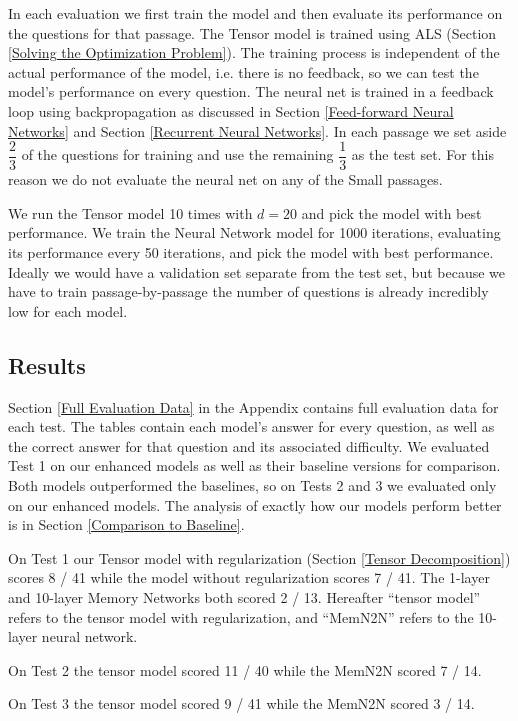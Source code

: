 \documentclass[pageno]{final_paper}
\begin{document}
In each evaluation we first train the model and then evaluate its performance on
the questions for that passage. The Tensor model is trained using ALS (Section
\ref{Solving the Optimization Problem}). The training process is independent of
the actual performance of the model, i.e. there is no feedback, so we can test
the model's performance on every question. The neural net is trained in a
feedback loop using backpropagation as discussed in Section \ref{Feed-forward
Neural Networks} and Section \ref{Recurrent Neural Networks}. In each passage we
set aside $\dfrac{2}{3}$ of the questions for training and use the remaining
$\dfrac{1}{3}$ as the test set. For this reason we do not evaluate the neural
net on any of the Small passages.

We run the Tensor model 10 times with $d=20$ and pick the model with best
performance. We train the Neural Network model for 1000 iterations, evaluating
its performance every 50 iterations, and pick the model with best performance.
Ideally we would have a validation set separate from the test set, but because
we have to train passage-by-passage the number of questions is already
incredibly low for each model.

\subsection{Results}
\label{Results}

Section \ref{Full Evaluation Data} in the Appendix contains full evaluation data
for each test. The tables contain each model's answer for every question, as
well as the correct answer for that question and its associated difficulty. We
evaluated Test 1 on our enhanced models as well as their baseline versions for
comparison. Both models outperformed the baselines, so on Tests 2 and 3 we
evaluated only on our enhanced models. The analysis of exactly how our models
perform better is in Section \ref{Comparison to Baseline}.

On Test 1 our Tensor model with regularization (Section \ref{Tensor
Decomposition}) scores 8 / 41 while the model without regularization scores 7 /
41. The 1-layer and 10-layer Memory Networks both scored 2 / 13. Hereafter
``tensor model'' refers to the tensor model with regularization, and ``MemN2N''
refers to the 10-layer neural network.

On Test 2 the tensor model scored 11 / 40 while the MemN2N scored 7 / 14.

On Test 3 the tensor model scored 9 / 41 while the MemN2N scored 3 / 14.
\end{document}
